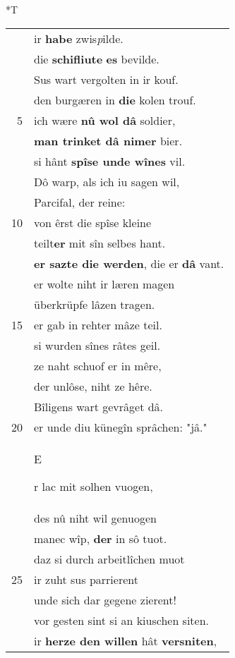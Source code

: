 \documentclass[8pt,a4paper,notitlepage]{article}
\begin{document}
\begin{table}[ht]
\begin{minipage}[t]{0.5\linewidth}
\end{minipage}
\hspace{0.5cm}
\begin{minipage}[t]{0.5\linewidth}
\small
\begin{center}*T
\end{center}
\begin{tabular}{rl}
 & ir \textbf{habe} zwis\textit{p}ilde.\\ 
 & die \textbf{schifliute} \textbf{es} bevilde.\\ 
 & Sus wart vergolten in ir kouf.\\ 
 & den burgæren in \textbf{die} kolen trouf.\\ 
5 & ich wære \textbf{nû wol dâ} soldier,\\ 
 & \textbf{man trinket dâ nimer} bier.\\ 
 & si hânt \textbf{spîse unde wînes} vil.\\ 
 & Dô warp, als ich iu sagen wil,\\ 
 & Parcifal, der reine:\\ 
10 & von êrst die spîse kleine\\ 
 & teilt\textbf{er} mit sîn selbes hant.\\ 
 & \textbf{er sazte die werden}, die er \textbf{dâ} vant.\\ 
 & er wolte niht ir læren magen\\ 
 & überkrüpfe lâzen tragen.\\ 
15 & er gab in rehter mâze teil.\\ 
 & si wurden sînes râtes geil.\\ 
 & ze naht schuof er in mêre,\\ 
 & der unlôse, niht ze hêre.\\ 
 & Bîligens wart gevrâget dâ.\\ 
20 & er unde diu künegîn sprâchen: "jâ."\\ 
 & \begin{large}E\end{large}r lac mit solhen vuogen,\\ 
 & des nû niht wil genuogen\\ 
 & manec wîp, \textbf{der} in sô tuot.\\ 
 & daz si durch arbeitlîchen muot\\ 
25 & ir zuht sus parrierent\\ 
 & unde sich dar gegene zierent!\\ 
 & vor gesten sint si an kiuschen siten.\\ 
 & ir \textbf{herze den willen} hât \textbf{versniten},\\ 

\end{tabular}
\end{minipage}
\end{table}
\end{document}
